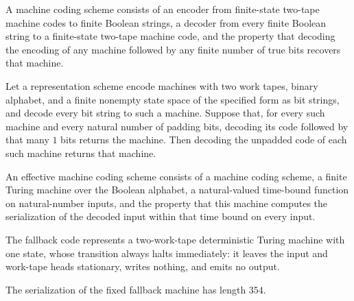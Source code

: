\begin{definition}
\label{Turing.MachineCode2}
\leanok
{}
A machine coding scheme consists of an encoder from finite-state two-tape machine codes
to finite Boolean strings, a decoder from every finite Boolean string to a finite-state
two-tape machine code, and the property that decoding the encoding of any machine
followed by any finite number of true bits recovers that machine.
\end{definition}

\begin{theorem}
\label{Turing.MachineCode2.decode_encode}
\leanok
{}
Let a representation scheme encode machines with two work tapes, binary alphabet, and a
finite nonempty state space of the specified form as bit strings, and decode every bit
string to such a machine. Suppose that, for every such machine and every natural number
of padding bits, decoding its code followed by that many $1$ bits returns the machine.
Then decoding the unpadded code of each such machine returns that machine.
\end{theorem}

\begin{definition}
\label{Turing.EffectiveMachineCode2}
\leanok
{}
An effective machine coding scheme consists of a machine coding scheme, a finite Turing
machine over the Boolean alphabet, a natural-valued time-bound function on
natural-number inputs, and the property that this machine computes the serialization of
the decoded input within that time bound on every input.
\end{definition}

\begin{definition}
\label{Turing.zfBFallback}
\leanok
{}
The fallback code represents a two-work-tape deterministic Turing machine with one
state, whose transition always halts immediately: it leaves the input and work-tape
heads stationary, writes nothing, and emits no output.
\end{definition}

\begin{lemma}
\label{Turing.zfBFallback_serialize_length}
\leanok
{}
The serialization of the fixed fallback machine has length $354$.
\end{lemma}

